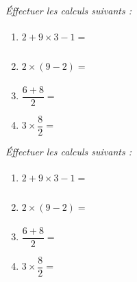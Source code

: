 \documentclass[13pt]{article}
\begin{document}
\vspace{0.3cm}
\noindent\hrulefill
\vspace{0.3cm}


\begin{multicols}{2}

  \textit{Éffectuer les calculs suivants :}

  \begin{enumerate}
  \item $2 + 9 \times 3 - 1 = \phantom{\dfrac{1}{1}}$ 
  \item $2 \times (9 - 2) = \phantom{\dfrac{1}{1}} $
  \item $\dfrac{6 + 8}{2} = $
  \item $3 \times \dfrac{8}{2} = $
  \end{enumerate}

  \textit{Éffectuer les calculs suivants :}

  \begin{enumerate}
  \item $2 + 9 \times 3 - 1 = \phantom{\dfrac{1}{1}}$ 
  \item $2 \times (9 - 2) = \phantom{\dfrac{1}{1}}$
  \item $\dfrac{6 + 8}{2} = $
  \item $3 \times \dfrac{8}{2} = $
  \end{enumerate}

\end{multicols}
\end{document}
